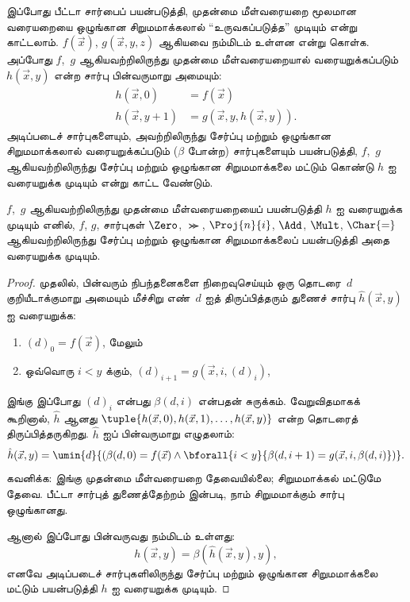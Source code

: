 \documentclass[../../../include/open-logic-section]{subfiles}
\begin{document}


இப்போது பீட்டா சார்பைப் பயன்படுத்தி, முதன்மை மீள்வரையறை மூலமான வரையறையை
ஒழுங்கான சிறுமமாக்கலால் ``உருவகப்படுத்த'' முடியும் என்று காட்டலாம்.
$f(\vec x)$, $g(\vec x, y, z)$ ஆகியவை நம்மிடம் உள்ளன என்று கொள்க.
அப்போது $f$,~$g$ ஆகியவற்றிலிருந்து முதன்மை மீள்வரையறையால் வரையறுக்கப்படும்
$h(\vec x,y)$ என்ற சார்பு பின்வருமாறு அமையும்:
\begin{align*}
h(\vec x, 0) & =  f(\vec x) \\
h(\vec x, y+1) & =  g(\vec x, y, h(\vec x, y)).
\end{align*}
அடிப்படைச் சார்புகளையும், அவற்றிலிருந்து சேர்ப்பு மற்றும் ஒழுங்கான
சிறுமமாக்கலால் வரையறுக்கப்படும் ($\beta$ போன்ற) சார்புகளையும் பயன்படுத்தி,
$f$,~$g$ ஆகியவற்றிலிருந்து சேர்ப்பு மற்றும் ஒழுங்கான சிறுமமாக்கலை மட்டும்
கொண்டு $h$ ஐ வரையறுக்க முடியும் என்று காட்ட வேண்டும்.

\begin{lem}
$f$,~$g$ ஆகியவற்றிலிருந்து முதன்மை மீள்வரையறையைப் பயன்படுத்தி $h$ ஐ
வரையறுக்க முடியும் எனில், $f$, $g$, சார்புகள் $\Zero$, $\Succ$,
$\Proj{n}{i}$, $\Add$, $\Mult$, $\Char{=}$ ஆகியவற்றிலிருந்து சேர்ப்பு
மற்றும் ஒழுங்கான சிறுமமாக்கலைப் பயன்படுத்தி அதை வரையறுக்க முடியும்.
\end{lem}

\begin{proof}
முதலில், பின்வரும் நிபந்தனைகளை நிறைவுசெய்யும் ஒரு தொடரை~$d$
குறியீடாக்குமாறு அமையும் மீச்சிறு எண்~$d$ ஐத் திருப்பித்தரும் துணைச் சார்பு
$\hat h(\vec x, y)$ ஐ வரையறுக்க:
\begin{enumerate}
\item $(d)_0 = f(\vec x)$, மேலும்
\item ஒவ்வொரு $i < y$ க்கும், $(d)_{i+1} = g(\vec x, i, (d)_i)$,
\end{enumerate}
இங்கு இப்போது $(d)_i$ என்பது $\beta(d,i)$ என்பதன் சுருக்கம்.
வேறுவிதமாகக் கூறினால், $\hat h$ ஆனது
$\tuple{h(\vec x, 0), h(\vec x, 1), \dots, h(\vec x, y)}$ என்ற
தொடரைத் திருப்பித்தருகிறது. $\hat h$ ஐப் பின்வருமாறு எழுதலாம்:
\[
\hat h(\vec x, y) = \umin{d}{(\beta(d,0) = f(\vec x) \land \bforall{i <
  y}{\beta(d,i+1) = g(\vec x, i,\beta(d,i)})}.
\]
கவனிக்க: இங்கு முதன்மை மீள்வரையறை தேவையில்லை; சிறுமமாக்கல் மட்டுமே
தேவை. பீட்டா சார்புத் துணைத்தேற்றம்  இன்படி, நாம்
சிறுமமாக்கும் சார்பு ஒழுங்கானது.

ஆனால் இப்போது பின்வருவது நம்மிடம் உள்ளது:
\[
h(\vec x, y) = \beta(\hat h(\vec x, y), y),
\]
எனவே அடிப்படைச் சார்புகளிலிருந்து சேர்ப்பு மற்றும் ஒழுங்கான சிறுமமாக்கலை
மட்டும் பயன்படுத்தி $h$ ஐ வரையறுக்க முடியும்.
\end{proof}
\end{document}
